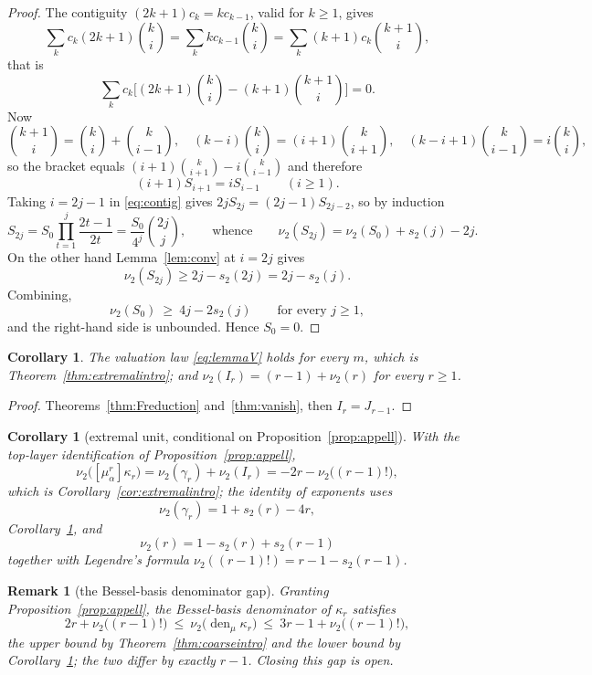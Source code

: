 \documentclass[10pt,a4paper]{amsart}
\newtheorem{corollary}[theorem]{Corollary}
\newtheorem{remark}[theorem]{Remark}
\DeclareMathOperator{\den}{den}
\newcommand{\ma}{\mu_\alpha}
\begin{document}
\begin{proof}
The contiguity $(2k+1)c_k=kc_{k-1}$, valid for $k\ge1$, gives
\[
  \sum_kc_k(2k+1)\binom ki=\sum_kkc_{k-1}\binom ki =\sum_k(k+1)c_k\binom{k+1}i ,
\]
that is
\[
\sum_kc_k\bigl[(2k+1)\binom ki-(k+1)\binom{k+1}i\bigr]=0.
\]
Now
\[
\binom{k+1}i=\binom ki+\binom k{i-1}, \quad (k-i)\binom ki=(i+1)\binom k{i+1}, \quad (k-i+1)\binom k{i-1}=i\binom ki,
\]
so the bracket equals $(i+1)\binom k{i+1}-i\binom k{i-1}$ and therefore
\begin{equation}\label{eq:contig}
  (i+1)S_{i+1}=iS_{i-1}\qquad(i\ge1).
\end{equation}
Taking $i=2j-1$ in \eqref{eq:contig} gives $2jS_{2j}=(2j-1)S_{2j-2}$, so by induction
\[
  S_{2j}=S_0\prod_{t=1}^j\frac{2t-1}{2t}=\frac{S_0}{4^j}\binom{2j}j,   \qquad\text{whence}\qquad   \nu_2(S_{2j})=\nu_2(S_0)+s_2(j)-2j .
\]
On the other hand Lemma~\ref{lem:conv} at $i=2j$ gives
\[
\nu_2(S_{2j})\ge 2j-s_2(2j)=2j-s_2(j).
\]
Combining,
\[
  \nu_2(S_0)\ \ge\ 4j-2s_2(j)\qquad\text{for every }j\ge1 ,
\]
and the right-hand side is unbounded.  Hence $S_0=0$.
\end{proof}

\begin{corollary}\label{cor:F}
The valuation law \eqref{eq:lemmaV} holds for every $m$, which is Theorem~\ref{thm:extremalintro}; and $\nu_2(I_r)=(r-1)+\nu_2(r)$ for every $r\ge1$.
\end{corollary}

\begin{proof}
Theorems~\ref{thm:Freduction} and~\ref{thm:vanish}, then $I_r=J_{r-1}$.
\end{proof}

\begin{corollary}[extremal unit, conditional on Proposition~\ref{prop:appell}]\label{cor:extremal}
With the top-layer identification of Proposition~\ref{prop:appell},
\[
\nu_2\bigl([\ma^r]\kappa_r\bigr)=\nu_2(\gamma_r)+\nu_2(I_r)=-2r-\nu_2\bigl((r-1)!\bigr),
\]
which is Corollary~\ref{cor:extremalintro}; the identity of exponents uses
\[
\nu_2(\gamma_r)=1+s_2(r)-4r, 
\]
Corollary~\ref{cor:F}, and
\[
\nu_2(r)=1-s_2(r)+s_2(r-1)
\]
 together with Legendre's formula $\nu_2((r-1)!)=r-1-s_2(r-1)$.
\end{corollary}

\begin{remark}[the Bessel-basis denominator gap]\label{rem:besselgap}
Granting Proposition~\ref{prop:appell}, the Bessel-basis denominator of $\kappa_r$ satisfies
\[
  2r+\nu_2\bigl((r-1)!\bigr)\ \le\
  \nu_2\bigl(\den\nolimits_\mu\kappa_r\bigr)\ \le\
  3r-1+\nu_2\bigl((r-1)!\bigr),
\]
the upper bound by Theorem~\ref{thm:coarseintro} and the lower bound by Corollary~\ref{cor:extremal}; the two differ by exactly $r-1$.  Closing this gap is open.
\end{remark}
\end{document}
